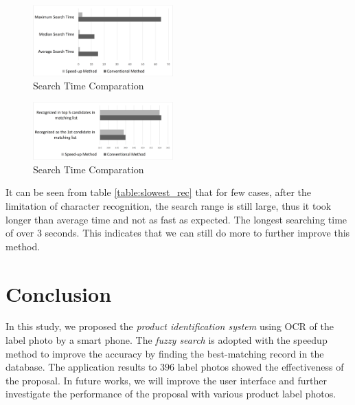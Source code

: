\documentclass[technicalreport]{ieicej}
\begin{document}
            \begin{figure}[t] 
                \begin{center}
                \includegraphics[width=0.48\textwidth]{figure/graph-time.pdf}
                \end{center}
                \caption{Search Time Comparation}
                \label{fig:graph-time}
            \end{figure}

            \begin{figure}[t] 
                \begin{center}
                \includegraphics[width=0.48\textwidth]{figure/graph-recognized.pdf}
                \end{center}
                \caption{Search Time Comparation}
                \label{fig:graph-recognized}
            \end{figure}

            
            It can be seen from table \ref{table:slowest_rec} that for few cases, after the limitation of character recognition, the search range is still large, thus it took longer than average time and not as fast as expected. The longest searching time of over $3$ seconds. This indicates that we can still do more to further improve this method.
               
     
\section{Conclusion}
\label{sec:conclusion}
    In this study, we proposed the {\em product identification system} using OCR of the label photo by a smart phone. The {\em fuzzy search} is adopted with the speedup method to improve the accuracy by finding the best-matching record in the database. The application results to $396$ label photos showed the effectiveness of the proposal. In future works, we will improve the user interface and further investigate the performance of the proposal with various product label photos.
            
\end{document}

